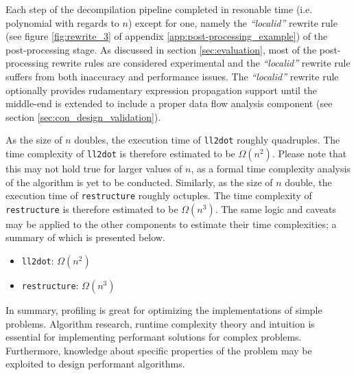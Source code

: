 Each step of the decompilation pipeline completed in resonable time (i.e. polynomial with regards to $ n $) except for one, namely the \textit{``localid''} rewrite rule (see figure \ref{fig:rewrite_3} of appendix \ref{app:post-processing_example}) of the post-processing stage. As discussed in section \ref{sec:evaluation}, most of the post-processing rewrite rules are considered experimental and the \textit{``localid''} rewrite rule suffers from both inaccuracy and performance issues. The \textit{``localid''} rewrite rule optionally provides rudamentary expression propagation support until the middle-end is extended to include a proper data flow analysis component (see section \ref{sec:con_design_validation}).

As the size of $ n $ doubles, the execution time of \texttt{ll2dot} roughly quadruples. The time complexity of \texttt{ll2dot} is therefore estimated to be $ \Omega(n^{2}) $. Please note that this may not hold true for larger values of $ n $, as a formal time complexity analysis of the algorithm is yet to be conducted. Similarly, as the size of $ n $ double, the execution time of \texttt{restructure} roughly octuples. The time complexity of \texttt{restructure} is therefore estimated to be $ \Omega(n^{3}) $. The same logic and caveats may be applied to the other components to estimate their time complexities; a summary of which is presented below.

\begin{itemize}
	\item \texttt{ll2dot}: $ \Omega(n^{2}) $
	\item \texttt{restructure}: $ \Omega(n^{3}) $
\end{itemize}


In summary, profiling is great for optimizing the implementations of simple problems. Algorithm research, runtime complexity theory and intuition is essential for implementing performant solutions for complex problems. Furthermore, knowledge about specific properties of the problem may be exploited to design performant algorithms.




